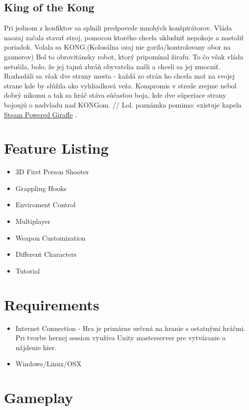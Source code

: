 \documentclass[a4paper]{report}
\begin{document}
\section{King of the Kong}
Pri jednom z konfiktov sa splnili predpovede mnohých konšpirátorov. Vláda naozaj začala stavať stroj, pomocou ktorého chcela ukludniť nepokoje a nastoliť poriadok. Volala sa KONG.(Kolosálna ozaj nie gorila/kontrolovany obor na gaunerov) Bol to obrovitánsky robot, ktorý pripomínal žirafu. To čo však vláda netušila, bolo, že jej tajnú zbráň obyvatelia našli a chceli sa jej zmocniť. Rozhadáli sa však dve strany mesta - každá zo strán ho chcela mať na svojej strane kde by slúžila ako vyhliadková veža. Kompromis v strede zrejme nebol dobrý nikomu a tak sa hráč stáva súčasťou boja, kde dve súperiace strany bojoujú o nadvladu nad KONGom. 
// Lol. poznámka pomimo: existuje kapela \href{https://youtu.be/dDRHx4cPgbE?t=50s}{Steam Powered Giraffe} . 
 

\chapter{Feature Listing}
\begin{itemize}
  \item 3D First Person Shooter
  \item Grappling Hooks
  \item Enviroment Control
  \item Multiplayer
  \item Weapon Customization
  \item Different Characters
  \item Tutorial
\end{itemize}

\chapter{Requirements}
\begin{itemize}
  \item Internet Connection - Hra je primárne určená na hranie s ostatnými hráčmi. Pri tvorbe hernej session využíva Unity masterserver pre vytváranie a nájdenie hier.
  \item Windows/Linux/OSX
\end{itemize}


\chapter{Gameplay}
\end{document}
